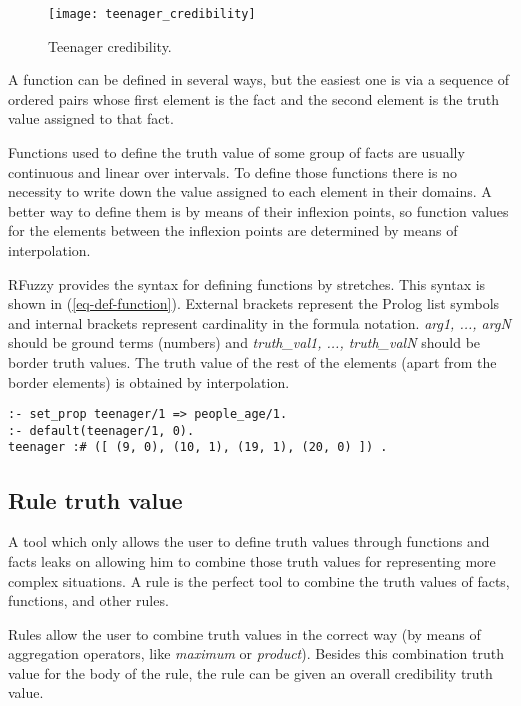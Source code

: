 \documentclass[runningheads,a4paper]{llncs}
\begin{document}
\begin{figure}
\centering
\texttt{[image: teenager\_credibility]} 
\caption{Teenager credibility.}
\label{fig:teenager_credibility}
\end{figure}


A function can be defined in several ways, but the easiest one is 
via a sequence of ordered pairs whose first element is the fact and the second element is the truth value 
assigned to that fact. 

Functions used to define the truth value of some group 
of facts are usually continuous and linear over intervals.
To define those functions there is no necessity to write down 
the value assigned to each element in their domains.
A better way to define them is by means of their
inflexion points, so function values for the elements between 
the inflexion points are determined by means of interpolation.

RFuzzy provides the syntax for defining functions by stretches. 
This syntax is shown in (\ref{eq-def-function}).
External brackets represent the Prolog list symbols and 
internal brackets represent cardinality in the formula notation. 
{\it arg1, ..., argN} should be ground terms (numbers) and {\it
truth\_val1, ..., truth\_valN} should be border truth values. The
truth value of the rest of the elements (apart from the border
elements) is obtained by interpolation.


\begin{verbatim}
:- set_prop teenager/1 => people_age/1.
:- default(teenager/1, 0).
teenager :# ([ (9, 0), (10, 1), (19, 1), (20, 0) ]) .
\end{verbatim}

\subsection{Rule truth value}
\label{rule-truth-value}

A tool which only allows the user to define truth values through 
functions and facts leaks on allowing him to combine those 
truth values for representing more complex situations.
A rule is the perfect tool to combine the truth values
of facts, functions, and other rules.

Rules allow the user to combine truth values in the correct way
(by means of aggregation operators, 
like {\it maximum} or {\it product}).
Besides this combination truth value for the body of the rule, 
the rule can be given an overall credibility truth value.
\end{document}
